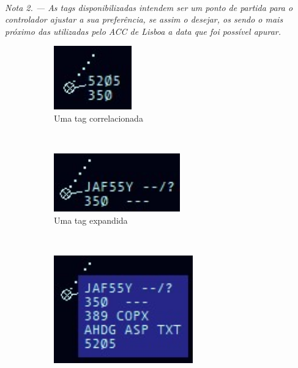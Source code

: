 \documentclass[10pt]{report}
\begin{document}
\paragraph*{}
\textit{Nota 2. — As tags disponibilizadas intendem ser um ponto de partida para o controlador
ajustar a sua preferência, se assim o desejar, os sendo o mais próximo das utilizadas pelo ACC
de Lisboa a data que foi possível apurar.}

\begin{figure}[h]
    \centering
    \begin{subfigure}[b]{0.3\textwidth}
        \begin{center}
            \includegraphics[width=0.37\textwidth]{figures/correlated-tag}
            \caption{Uma tag correlacionada}
            \label{fig:correlated}
        \end{center}
    \end{subfigure}
    ~ %
    \begin{subfigure}[b]{0.3\textwidth}
        \begin{center}
            \includegraphics[width=0.6\textwidth]{figures/expanded-tag}
            \caption{Uma tag expandida}
            \label{fig:expanded}
        \end{center}
    \end{subfigure}
    ~ %
    \begin{subfigure}[b]{0.3\textwidth}
        \begin{center}
            \includegraphics[width=0.66\textwidth]{figures/detailed-tag}

\end{center}
\end{subfigure}
\end{figure}
\end{document}
